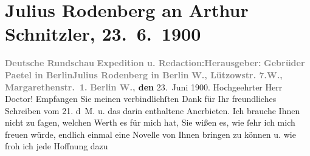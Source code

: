 

         \renewcommand{\erwaehnteInstitutionen}{Institutionen: Deutsche Rundschau, Gebrüder Paetel Verlag}
         \renewcommand{\erwaehnteOrte}{Orte: Berlin, Lützowstraße, Margaretenstraße, Wien}
         \renewcommand{\erwaehnteWerke}{Werke: Frau Bertha Garlan. Roman}
               \section[Julius Rodenberg an Arthur Schnitzler, 23. 6. 1900]{ Julius Rodenberg an Arthur Schnitzler, 23. 6. 1900}\nopagebreak{}\rehead{ }\begin{ledgroupsized}[t]{13cm}\normalsize\beginnumbering \toendnotes[C]{\smallbreak\pagebreak[2]} 
\toendnotes[C]{\smallbreak}\pstart
           \noindent{}\centering{}{\pb}\textcolor{gray}{\textbf{Deutsche Rundschau}}\pend
           \pstart
           \noindent{}\textcolor{gray}{\textbf{Expedition u. Redaction:}}\hfill \textcolor{gray}{\textbf{Herausgeber:}}\pend
           \pstart
           \textcolor{gray}{\textbf{Gebrüder Paetel in Berlin}}\hfill \textcolor{gray}{\textbf{Julius Rodenberg in Berlin}}\pend
           \pstart
           \textcolor{gray}{\textbf{W., Lützowstr. 7.}}\hfill \textcolor{gray}{\textbf{W., Margarethenstr. 1.}}\pend
           \pstart
           \raggedleft{}\textbf{\textcolor{gray}{\textbf{Berlin W.,}} den}{ }23. Juni 1900.\pend
           \pstart{}Hochgeehrter Herr Doctor!\pend\pstart
           Empfangen Sie meinen verbindlichſten Dank für Ihr freundliches Schreiben vom
                  21. d M. u. das darin enthaltene Anerbieten. Ich brauche Ihnen nicht
               zu ſagen, welchen Werth es für mich hat, Sie wißen es, wie ſehr ich mich freuen
               würde, endlich einmal eine Novelle von Ihnen bringen zu können u. wie froh ich jede Hoffnung dazu

\end{ledgroupsized}
